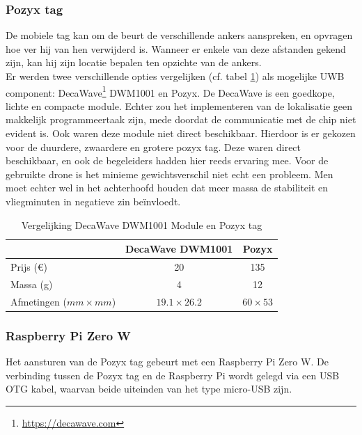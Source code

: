 \subsubsection{Pozyx tag}  \label{sec:pozyx_tag}
De mobiele tag kan om de beurt de verschillende ankers aanspreken, en opvragen hoe ver hij van hen verwijderd is. Wanneer er enkele van deze afstanden gekend zijn, kan hij zijn locatie bepalen ten opzichte van de ankers.\\

Er werden twee verschillende opties vergelijken (cf. tabel \ref{tab:decavspozyx}) als mogelijke UWB component: DecaWave\footnote{\url{https://decawave.com}} DWM1001 en Pozyx. De DecaWave is een goedkope, lichte en compacte module. Echter zou het implementeren van de lokalisatie geen makkelijk programmeertaak zijn, mede doordat de communicatie met de chip niet evident is. Ook waren deze module niet direct beschikbaar. Hierdoor is er gekozen voor de duurdere, zwaardere en grotere pozyx tag. Deze waren direct beschikbaar, en ook de begeleiders hadden hier reeds ervaring mee. Voor de gebruikte drone is het minieme gewichtsverschil niet echt een probleem. Men moet echter wel in het achterhoofd houden dat meer massa de stabiliteit en vliegminuten in negatieve zin be\"invloedt.\\

\begin{table}[p]
	\centering
	\begin{tabular}{ | l | c | c | } \hline
		& DecaWave DWM1001 & Pozyx \\
		\hline 
		\hline
		Prijs (\euro{}) & 20 & 135 \\ 
		\hline
		Massa (g) & 4 & 12 \\ 
		\hline
		Afmetingen ($mm \times mm$) & $19.1 \times 26.2$ & $60 \times 53$ \\ 
		\hline
	\end{tabular}
	\caption[Vergelijking DecaWave DWM1001 Module en Pozyx tag]{Vergelijking DecaWave DWM1001 Module en Pozyx tag}
	\label{tab:decavspozyx}
\end{table}

\subsubsection{Raspberry Pi Zero W} \label{sec:raspberry_pi}

Het aansturen van de Pozyx tag gebeurt met een Raspberry Pi Zero W. De verbinding tussen de Pozyx tag en de Raspberry Pi wordt gelegd via een USB OTG kabel, waarvan beide uiteinden van het type micro-USB zijn.

